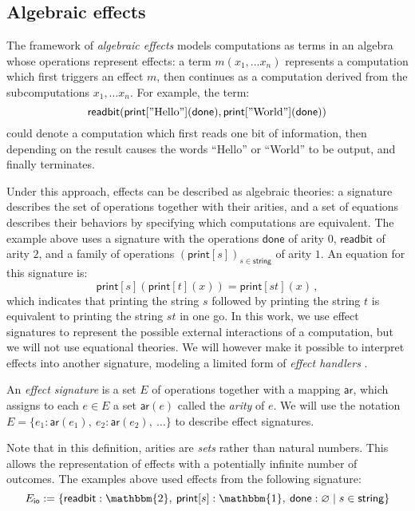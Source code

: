 \documentclass[sigplan,screen]{acmart}
\newcommand{\kw}[1]{\ensuremath{ \mathsf{#1} }}
\begin{document}
\subsection{Algebraic effects} \label{sec:bg:sig} %

The framework of \emph{algebraic effects}
models computations as terms in an algebra
whose operations represent effects:
a term $m(x_1, \ldots x_n)$
represents a computation which first
triggers an effect $m$,
then continues as a computation derived from
the subcomputations $x_1, \ldots x_n$.
For example,
the term:
\[
    \kw{readbit}(
      \kw{print}["\text{Hello}"](\kw{done}),
      \kw{print}["\text{World}"](\kw{done}))
\]
could denote a computation which
first reads one bit of information,
then depending on the result
causes the words ``Hello'' or ``World'' to be output,
and finally terminates.

Under this approach,
effects can be described as algebraic theories:
a signature describes the set of operations together with their arities,
and a set of equations describes their behaviors
by specifying which computations are equivalent.
The example above uses a signature with the operations
$\kw{done}$ of arity $0$,
$\kw{readbit}$ of arity $2$,
and a family of operations $(\kw{print}[s])_{s \in \kw{string}}$
of arity $1$.
An equation for this signature is:
\[
    \kw{print}[s](\kw{print}[t](x)) =
    \kw{print}[st](x) \,,
\]
which indicates that
printing the string $s$ followed by
printing the string $t$ is equivalent to
printing the string $st$ in one go.
In this work,
we use effect signatures to represent
the possible external interactions
of a computation,
but we will not use equational theories.
We will however make it possible to interpret effects
into another signature,
modeling a limited form of
\emph{effect handlers} \cite{eff}.

\begin{definition} \label{def:esig}
An \emph{effect signature}
is a set $E$ of operations
together with a mapping $\kw{ar}$,
which assigns to each $e \in E$ a set $\kw{ar}(e)$
called the \emph{arity} of $e$.
We will use the notation
$E = \{ e_1 : \kw{ar}(e_1), \: e_2 : \kw{ar}(e_2), \: \ldots \}$
to describe effect signatures.
\end{definition}

Note that in this definition,
arities are \emph{sets} rather than natural numbers.
This allows the representation of effects
with a potentially infinite number of outcomes.
The examples above
used effects from the following signature:
\[
  E_\kw{io} :=
  \{ \kw{readbit} : \mathbbm{2}, \:
     \kw{print}[s] : \mathbbm{1}, \:
     \kw{done} : \varnothing \mid
     s \in \kw{string} \}
\]
\end{document}
